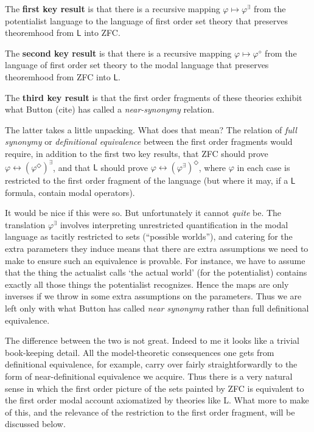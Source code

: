 \documentclass{article}
\begin{document}
The {\bf first key result} is that there is a recursive mapping 
$\varphi \mapsto \varphi^\exists$ from the potentialist 
language to the language of first order set theory that preserves theoremhood 
from $\mathsf{L}$ into ZFC.

The {\bf second key result} is that there is a recursive mapping 
$\varphi \mapsto \varphi^\diamond$ from the language of first 
order set theory to the modal language that preserves theoremhood 
from ZFC into $\mathsf{L}$.

The {\bf third key result} is that the first order fragments of these theories 
exhibit what Button (cite) has called a \emph{near-synonymy} relation.

The latter takes a little unpacking. What does that mean? 
The relation of \emph{full synonymy} or \emph{definitional equivalence} between 
the first order fragments would require, in addition to the first two key results, 
that ZFC should prove $\varphi \leftrightarrow (\varphi^\Diamond)^\exists$, 
and that $\mathsf{L}$ should prove
$\varphi \leftrightarrow (\varphi^\exists)^\Diamond$, where $\varphi$ in each case 
is restricted to the first order fragment of the language (but where it may, if a 
$\mathsf{L}$ formula, contain modal operators).

It would be nice if this were so. But unfortunately it cannot \emph{quite} be. 
The translation $\varphi^\exists$ 
involves interpreting unrestricted quantification in the modal language as 
tacitly restricted 
to sets (``possible worlds''), and catering for the extra parameters they 
induce means that there
are extra assumptions we need to make to ensure such an equivalence is 
provable. For 
instance, we have to assume that the thing the actualist calls 
`the actual world' (for the potentialist)
contains exactly all those things the potentialist recognizes. 
Hence the maps 
are only inverses if we throw in some extra assumptions on the parameters.  
Thus we are 
left only with what Button has called \emph{near synonymy} 
rather than full definitional 
equivalence.

The difference between the two is not great. 
Indeed to me it looks like a trivial book-keeping detail. 
All the model-theoretic consequences one gets 
from definitional equivalence, for example, carry over fairly straightforwardly to the form of 
near-definitional equivalence we acquire. 
Thus there is a very natural sense in which the first order 
picture of the sets painted by ZFC is equivalent to the 
first order modal account axiomatized by theories like L. 
What more to make of this, and the relevance of the restriction to the 
first order fragment, will be discussed below.
\end{document}
